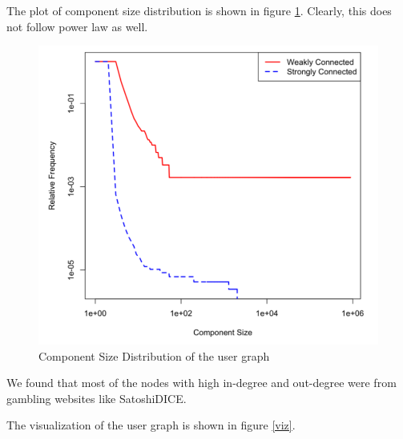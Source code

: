 \documentclass[runningheads,a4paper]{llncs}[2017/09/04]
\begin{document}
The plot of component size distribution is shown in figure \ref{comp}. Clearly, this does not follow power law as well.

\begin{figure}[h]
	\centering 
	\includegraphics[width=0.8\columnwidth]{comp} 
	\caption{Component Size Distribution of the user graph} %
	\label{comp}
\end{figure}

We found that most of the nodes with high in-degree and out-degree were from gambling websites like SatoshiDICE.

The visualization of the user graph is shown in figure \ref{viz}.
\end{document}
